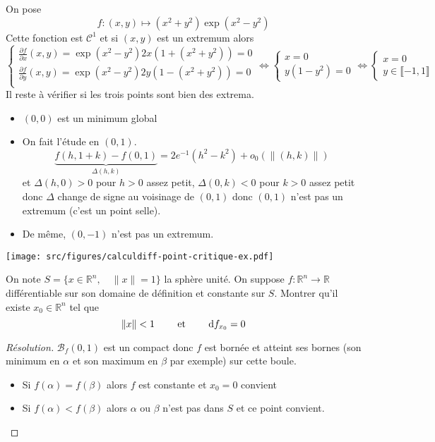 \begin{ex}
    On pose \[
        f:(x, y)\longmapsto (x^2+y^2)\exp(x^2-y^2)
    \]
    Cette fonction est $\mathcal C^1$ et si $(x, y)$ est un extremum alors \[
        \begin{cases}
            \displaystyle \frac{\partial f}{\partial x}(x, y)=\exp(x^2-y^2)2x(1+(x^2+y^2)) =0 \\[1em]
            \displaystyle \frac{\partial f}{\partial y}(x, y)=\exp(x^2-y^2)2y(1-(x^2+y^2)) =0 \\
            \end{cases} \iff \begin{cases}
            x=0 \\ y(1-y^2)=0
            \end{cases} \iff \begin{cases}
            x=0\\
            y\in \llbracket -1, 1\rrbracket
        \end{cases}
    \]
    Il reste à vérifier si les trois points sont bien des extrema. \begin{itemize}
        \item $(0, 0)$ est un minimum global
        \item On fait l'étude en $(0, 1)$. \[
                \underbrace{f(h, 1+k)-f(0, 1)}_{\Delta(h, k)}=2e^{-1}(h^2-k^2)+o_0(\|(h, k)\|)
            \]
            et $\Delta(h, 0)>0$ pour $h>0$ assez petit, $\Delta(0, k)<0$ pour $k>0$ assez petit donc $\Delta$ change de signe au voisinage de $(0, 1)$ donc $(0, 1)$ n'est pas un extremum (c'est un point selle).
        \item De même, $(0, -1)$ n'est pas un extremum.
    \end{itemize}

    \begin{center}
        \texttt{[image: src/figures/calculdiff-point-critique-ex.pdf]}
    \end{center}

\end{ex}

\begin{exo}
    On note $S=\{x\in\mathbb R^n, \quad \|x\|=1\}$ la sphère unité. On suppose $f:\mathbb R^n\to \mathbb R$ différentiable sur son domaine de définition et constante sur $S$. Montrer qu'il existe $x_0\in\mathbb R^n$ tel que \[
        \|x\|<1 \qquad\text{ et }\qquad \mathrm{d} f_{x_0}=0
    \]
\end{exo}

\begin{proof}[Résolution]
    $\mathcal B_f(0, 1)$ est un compact donc $f$ est bornée et atteint ses bornes (son minimum en $\alpha$ et son maximum en $\beta$ par exemple) sur cette boule.
    \begin{itemize}
        \item Si $f(\alpha)=f(\beta)$ alors $f$ est constante et $x_0=0$ convient
        \item Si $f(\alpha)<f(\beta)$ alors $\alpha$ ou $\beta$ n'est pas dans $S$ et ce point convient.
    \end{itemize}
\end{proof}

